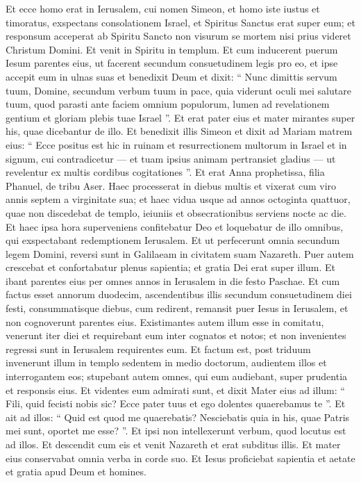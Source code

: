 \begin{biblechapter}
\begin{biblechapter}
 \verse Et ecce homo erat in Ierusalem, cui nomen Simeon, et homo iste iustus et timoratus, exspectans consolationem Israel, et Spiritus Sanctus erat super eum; 
\verse et responsum acceperat ab Spiritu Sancto non visurum se mortem nisi prius videret Christum Domini. 
\verse Et venit in Spiritu in templum. Et cum inducerent puerum Iesum parentes eius, ut facerent secundum consuetudinem legis pro eo, 
\verse et ipse accepit eum in ulnas suas et benedixit Deum et dixit:
 \verse “ Nunc dimittis servum tuum, Domine,
 secundum verbum tuum in pace,
 \verse quia viderunt oculi mei
 salutare tuum,
 \verse quod parasti
 ante faciem omnium populorum,
 \verse lumen ad revelationem gentium
 et gloriam plebis tuae Israel ”.
 \verse Et erat pater eius et mater mirantes super his, quae dicebantur de illo. 
 \verse Et benedixit illis Simeon et dixit ad Mariam matrem eius: “ Ecce positus est hic in ruinam et resurrectionem multorum in Israel et in signum, cui contradicetur 
\verse — et tuam ipsius animam pertransiet gladius — ut revelentur ex multis cordibus cogitationes ”.
 \verse Et erat Anna prophetissa, filia Phanuel, de tribu Aser. Haec processerat in diebus multis et vixerat cum viro annis septem a virginitate sua; 
\verse et haec vidua usque ad annos octoginta quattuor, quae non discedebat de templo, ieiuniis et obsecrationibus serviens nocte ac die. 
\verse Et haec ipsa hora superveniens confitebatur Deo et loquebatur de illo omnibus, qui exspectabant redemptionem Ierusalem.
 \verse Et ut perfecerunt omnia secundum legem Domini, reversi sunt in Galilaeam in civitatem suam Nazareth. 
\verse Puer autem crescebat et confortabatur plenus sapientia; et gratia Dei erat super illum.
 \verse Et ibant parentes eius per omnes annos in Ierusalem in die festo Paschae. 
 \verse Et cum factus esset annorum duodecim, ascendentibus illis secundum consuetudinem diei festi, 
\verse consummatisque diebus, cum redirent, remansit puer Iesus in Ierusalem, et non cognoverunt parentes eius. 
\verse Existimantes autem illum esse in comitatu, venerunt iter diei et requirebant eum inter cognatos et notos; 
\verse et non invenientes regressi sunt in Ierusalem requirentes eum. 
\verse Et factum est, post triduum invenerunt illum in templo sedentem in medio doctorum, audientem illos et interrogantem eos; 
\verse stupebant autem omnes, qui eum audiebant, super prudentia et responsis eius. 
 \verse Et videntes eum admirati sunt, et dixit Mater eius ad illum: “ Fili, quid fecisti nobis sic? Ecce pater tuus et ego dolentes quaerebamus te ”. 
\verse Et ait ad illos: “ Quid est quod me quaerebatis? Nesciebatis quia in his, quae Patris mei sunt, oportet me esse? ”. 
\verse Et ipsi non intellexerunt verbum, quod locutus est ad illos.
 \verse Et descendit cum eis et venit Nazareth et erat subditus illis. Et mater eius conservabat omnia verba in corde suo. 
\verse Et Iesus proficiebat sapientia et aetate et gratia apud Deum et homines.
 

\end{biblechapter}
\end{biblechapter}
